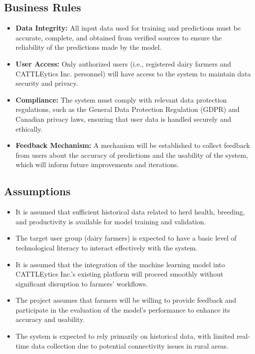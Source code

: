 \documentclass[12pt]{article}
\begin{document}
\subsection{Business Rules}
\begin{itemize}
    \item \textbf{Data Integrity:} All input data used for training and 
    predictions must be accurate, complete, and obtained from verified sources 
    to ensure the reliability of the predictions made by the model.
    \item \textbf{User Access:} Only authorized users (i.e., registered dairy 
    farmers and CATTLEytics Inc. personnel) will have access to the system to 
    maintain data security and privacy.
    \item \textbf{Compliance:} The system must comply with relevant data 
    protection regulations, such as the General Data Protection Regulation 
    (GDPR) and Canadian privacy laws, ensuring that user data is handled 
    securely and ethically.
    \item \textbf{Feedback Mechanism:} A mechanism will be established to 
    collect feedback from users about the accuracy of predictions and the 
    usability of the system, which will inform future improvements and 
    iterations.
\end{itemize}

\subsection{Assumptions}
\begin{itemize}
    \item It is assumed that sufficient historical data related to herd health, 
    breeding, and productivity is available for model training and validation.
    \item The target user group (dairy farmers) is expected to have a basic 
    level of technological literacy to interact effectively with the system.
    \item It is assumed that the integration of the machine learning model into 
    CATTLEytics Inc.'s existing platform will proceed smoothly without 
    significant disruption to farmers' workflows.
    \item The project assumes that farmers will be willing to provide feedback 
    and participate in the evaluation of the model's performance to enhance its 
    accuracy and usability.
    \item The system is expected to rely primarily on historical data, with 
    limited real-time data collection due to potential connectivity issues in 
    rural areas.
\end{itemize}
\end{document}
